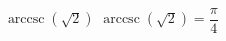  {$\operatorname{arccsc} \left( \sqrt{2} \right)$}
{ $\operatorname{arccsc} \left( \sqrt{2} \right) = \dfrac{\pi}{4}$}
